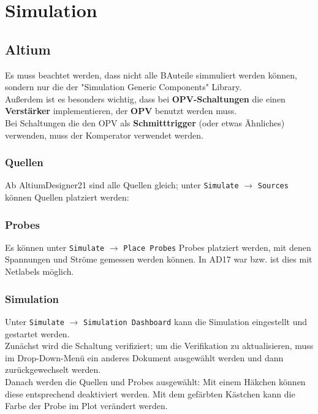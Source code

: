 \chapter{Simulation}

\section{Altium}
Es muss beachtet werden, dass nicht alle BAuteile simmuliert werden können, sondern nur die der "Simulation Generic Components" Library.\\

Außerdem ist es besonders wichtig, dass bei \textbf{OPV-Schaltungen} die einen \textbf{Verstärker} implementieren, der \textbf{OPV} benutzt werden muss.\\
Bei Schaltungen die den OPV als \textbf{Schmitttrigger} (oder etwas Ähnliches) verwenden, muss der Komperator verwendet werden.

\subsection{Quellen}
Ab AltiumDesigner21 sind alle Quellen gleich; unter \verb|Simulate| $\rightarrow$ \verb|Sources| können Quellen platziert werden:

\subsection{Probes}
Es können unter \verb|Simulate| $\rightarrow$ \verb|Place Probes| Probes platziert werden, mit denen Spannungen und Ströme gemessen werden können. In AD17 war bzw. ist dies mit Netlabels möglich.

\subsection{Simulation}
Unter \verb|Simulate| $\rightarrow$ \verb|Simulation Dashboard| kann die Simulation eingestellt und gestartet werden. \\
Zunächst wird die Schaltung verifiziert; um die Verifikation zu aktualisieren, muss im Drop-Down-Menü ein anderes Dokument ausgewählt werden und dann zurückgewechselt werden. \\

Danach werden die Quellen und Probes ausgewählt: Mit einem Häkchen können diese entsprechend deaktiviert werden. Mit dem gefärbten Kästchen kann die Farbe der Probe im Plot verändert werden. \\

